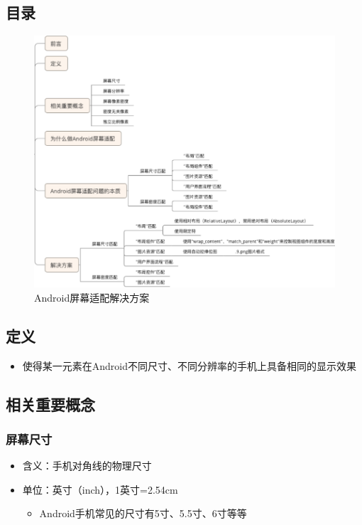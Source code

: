 \documentclass[9pt, b5paper]{article}
\begin{document}
\subsection{目录}
\label{sec-6-2}

\begin{figure}[htb]
\centering
\includegraphics[width=.9\linewidth]{./pic/screenAdapter.png}
\caption{Android屏幕适配解决方案}
\end{figure}

\subsection{定义}
\label{sec-6-3}
\begin{itemize}
\item 使得某一元素在Android不同尺寸、不同分辨率的手机上具备相同的显示效果
\end{itemize}
\subsection{相关重要概念}
\label{sec-6-4}
\subsubsection{屏幕尺寸}
\label{sec-6-4-1}
\begin{itemize}
\item 含义：手机对角线的物理尺寸
\item 单位：英寸（inch），1英寸=2.54cm
\begin{itemize}
\item Android手机常见的尺寸有5寸、5.5寸、6寸等等
\end{itemize}
\end{itemize}
\end{document}
